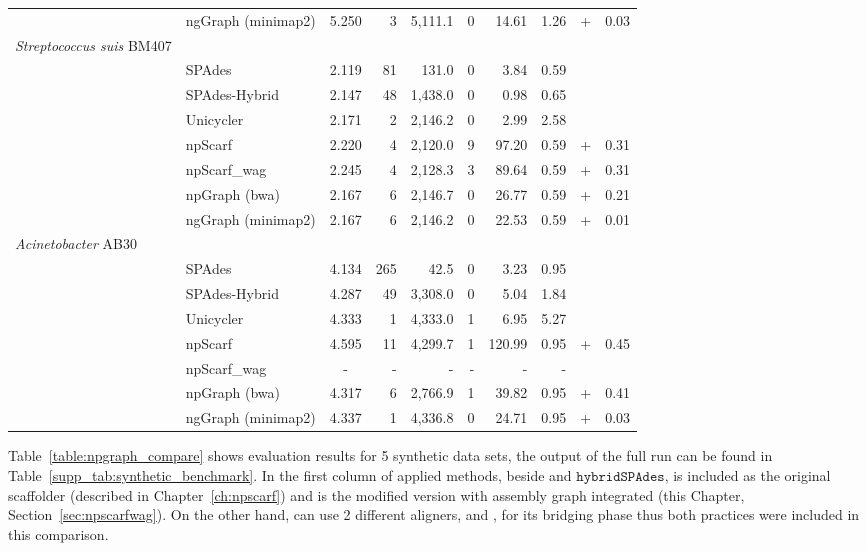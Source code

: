 \begin{longtable}{llcrrrrr@{\hspace{2pt}}c@{\hspace{2pt}}r}
 & ngGraph (minimap2)  & 5.250 & 3  & 5,111.1  & 0  & 14.61  &  1.26 & + & 0.03 \\
\rowcolor{Gray} \multicolumn{10}{l}
{\emph{Streptococcus suis} BM407} \\*  
 & SPAdes  & 2.119 &  81 &  131.0 & 0  & 3.84  & 0.59  &  &  \\*
 & SPAdes-Hybrid  & 2.147 & 48  &  1,438.0 &  0 &  0.98 & 0.65  &  &  \\*
 & Unicycler  & 2.171 &  2 &  2,146.2 & 0  &  2.99 &  2.58  &  &  \\*
 & npScarf  & 2.220 &  4 &  2,120.0  & 9  & 97.20  & 0.59 & + & 0.31 \\*
 & npScarf\_wag  & 2.245 & 4  &  2,128.3  & 3  &  89.64 & 0.59 & + &  0.31\\*
 & npGraph (bwa)  & 2.167 & 6  & 2,146.7  &  0 &  26.77 & 0.59  & + &  0.21\\*
 & ngGraph (minimap2)  & 2.167 & 6  &  2,146.2 &  0 & 22.53  &  0.59 & + & 0.01 \\
\rowcolor{Gray} \multicolumn{10}{l}
{\emph{Acinetobacter} AB30} \\*  
 & SPAdes  & 4.134 & 265  & 42.5  &  0 &  3.23 & 0.95  &  &  \\*
 & SPAdes-Hybrid  & 4.287 & 49  &  3,308.0 &  0 & 5.04  & 1.84  &  &  \\*
 & Unicycler  & 4.333 & 1  &  4,333.0 &  1 & 6.95  &  5.27 &  &  \\*
 & npScarf  & 4.595 & 11  & 4,299.7  & 1  & 120.99  & 0.95  & + & 0.45 \\*
 & npScarf\_wag  & - & -  &  - & -  &  - &  - &  &  \\*
 & npGraph (bwa)  & 4.317 & 6  &  2,766.9 & 1  &  39.82 &  0.95 & + & 0.41 \\*
 & ngGraph (minimap2)  & 4.337 & 1  &  4,336.8 & 0  & 24.71  & 0.95  & + & 0.03 \\
\end{longtable}

\normalsize

Table~\ref{table:npgraph_compare} shows evaluation results for 5 synthetic data sets, the output of the full run can be found in Table~\ref{supp_tab:synthetic_benchmark}.
In the first column of applied methods, beside \unicycler{} and $\mathtt{hybridSPAdes}$, \npscarf{} is included as the original scaffolder (described in Chapter~\ref{ch:npscarf}) and \npscarfg{} is the modified version with assembly graph integrated (this Chapter, Section~\ref{sec:npscarfwag}).
On the other hand, \npgraph{} can use 2 different aligners, \bwa{} and \minimap{}, for its bridging phase thus both practices were included in this comparison.

